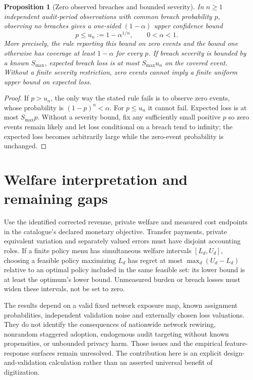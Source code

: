 \documentclass[11pt,a4paper]{article}
\newtheorem{proposition}[theorem]{Proposition}
\theoremstyle{definition}
\theoremstyle{remark}
\begin{document}
\begin{proposition}[Zero observed breaches and bounded severity]
In $n\geq1$ independent audit-period observations with common breach probability $p$, observing no breaches gives a one-sided $(1-\alpha)$ upper confidence bound
\[
 p\leq u_n:=1-\alpha^{1/n},\qquad 0<\alpha<1.
\]
More precisely, the rule reporting this bound on zero events and the bound one otherwise has coverage at least $1-\alpha$ for every $p$. If breach severity is bounded by a known $S_{\max}$, expected breach loss is at most $S_{\max}u_n$ on the covered event. Without a finite severity restriction, zero events cannot imply a finite uniform upper bound on expected loss.
\end{proposition}
\begin{proof}
If $p>u_n$, the only way the stated rule fails is to observe zero events, whose probability is $(1-p)^n<\alpha$. For $p\leq u_n$ it cannot fail. Expected loss is at most $S_{\max}p$. Without a severity bound, fix any sufficiently small positive $p$ so zero events remain likely and let loss conditional on a breach tend to infinity; the expected loss becomes arbitrarily large while the zero-event probability is unchanged.
\end{proof}

\section{Welfare interpretation and remaining gaps}
Use the identified corrected revenue, private welfare and measured cost endpoints in the catalogue's declared monetary objective. Transfer payments, private equivalent variation and separately valued errors must have disjoint accounting roles. If a finite policy menu has simultaneous welfare intervals $[L_d,U_d]$, choosing a feasible policy maximizing $L_d$ has regret at most $\max_d(U_d-L_d)$ relative to an optimal policy included in the same feasible set: its lower bound is at least the optimum's lower bound. Unmeasured burden or breach losses must widen these intervals, not be set to zero.

The results depend on a valid fixed network exposure map, known assignment probabilities, independent validation noise and externally chosen loss valuations. They do not identify the consequences of nationwide network rewiring, nonrandom staggered adoption, endogenous audit targeting without known propensities, or unbounded privacy harm. Those issues and the empirical feature-response surfaces remain unresolved. The contribution here is an explicit design-and-validation calculation rather than an asserted universal benefit of digitization.
\end{document}
